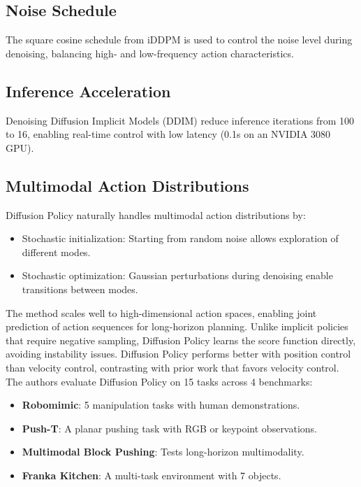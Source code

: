 \documentclass[12pt]{article}
\begin{document}
\begin{appendices}
\subsection*{Noise Schedule}
The square cosine schedule from iDDPM is used to control the noise level during denoising, balancing high- and low-frequency action characteristics.

\subsection*{Inference Acceleration}
Denoising Diffusion Implicit Models (DDIM) reduce inference iterations from 100 to 16, enabling real-time control with low latency (0.1s on an NVIDIA 3080 GPU).


\subsection*{Multimodal Action Distributions}
Diffusion Policy naturally handles multimodal action distributions by:
\begin{itemize}
    \item Stochastic initialization: Starting from random noise allows exploration of different modes.
    \item Stochastic optimization: Gaussian perturbations during denoising enable transitions between modes.
\end{itemize}
The method scales well to high-dimensional action spaces, enabling joint prediction of action sequences for long-horizon planning.
Unlike implicit policies that require negative sampling, Diffusion Policy learns the score function directly, avoiding instability issues.
Diffusion Policy performs better with position control than velocity control, contrasting with prior work that favors velocity control.\\
The authors evaluate Diffusion Policy on 15 tasks across 4 benchmarks:
\begin{itemize}
    \item \textbf{Robomimic}: 5 manipulation tasks with human demonstrations.
    \item \textbf{Push-T}: A planar pushing task with RGB or keypoint observations.
    \item \textbf{Multimodal Block Pushing}: Tests long-horizon multimodality.
    \item \textbf{Franka Kitchen}: A multi-task environment with 7 objects.
\end{itemize}


\end{appendices}
\end{document}
